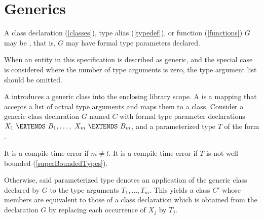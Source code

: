 \documentclass[makeidx]{article}
\begin{document}


\section{Generics}

\LMHash{}%
A class declaration (\ref{classes}), type alias (\ref{typedef}), or function (\ref{functions}) $G$ may be , that is, $G$ may have formal type parameters declared.

\LMHash{}%
When an entity in this specification is described as generic,
and the special case is considered where the number of type arguments is zero,
the type argument list should be omitted.


\LMHash{}%
A 
introduces a generic class into the enclosing library scope.
A 
is a mapping that accepts a list of actual type arguments and maps them to a class.
Consider a generic class declaration $G$ named $C$ with formal type parameter declarations
$X_1\ \EXTENDS\ B_1, \ldots,\ X_m\ \EXTENDS\ B_m$,
and a parameterized type $T$ of the form .

\LMHash{}%
It is a compile-time error if $m \not= l$.
It is a compile-time error if $T$ is not well-bounded
(\ref{superBoundedTypes}).

\LMHash{}%
Otherwise, said parameterized type  denotes an application of the generic class declared by $G$ to the type arguments $T_1, \ldots, T_m$.
This yields a class $C'$ whose members are equivalent to those of a class declaration which is obtained from the declaration $G$ by replacing each occurrence of $X_j$ by $T_j$.
\end{document}

